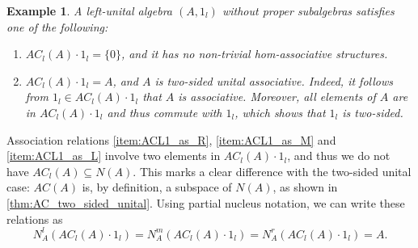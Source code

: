 \documentclass[12pt]{article}
\newtheorem{example}[theorem]{Example}
\begin{document}
		\begin{example}
			A left-unital algebra $(A,1_l)$ without proper subalgebras satisfies one of the following:
			\begin{enumerate}[label=\textnormal{\arabic*)}]
				\item $AC_l(A)\cdot 1_l=\{0\}$, and it has no non-trivial hom-associative structures.
				\item $AC_l(A)\cdot 1_l=A$, and $A$ is two-sided unital associative. Indeed, it follows from $1_l\in AC_l(A)\cdot 1_l$ that $A$ is associative. Moreover, all elements of $A$ are in $AC_l(A)\cdot 1_l$ and thus commute with $1_l$, which shows that $1_l$ is two-sided.
			\end{enumerate}
		\end{example}
		
		Association relations \ref{item:ACL1_as_R}, \ref{item:ACL1_as_M} and \ref{item:ACL1_as_L} involve two elements in $AC_l(A)\cdot 1_l$, and thus we do not have $AC_l(A)\subseteq N(A)$. This marks a clear difference with the two-sided unital case: $AC(A)$ is, by definition, a subspace of $N(A)$, as shown in \cref{thm:AC_two_sided_unital}.
		Using partial nucleus notation, we can write these relations as
		\begin{equation*}
			N_ A
			^l(AC_l(A)\cdot 1_l)=N_ A ^m(AC_l(A)\cdot 1_l)=N_ A ^r(AC_l(A)\cdot 1_l)= A .
		\end{equation*}
		
\end{document}
